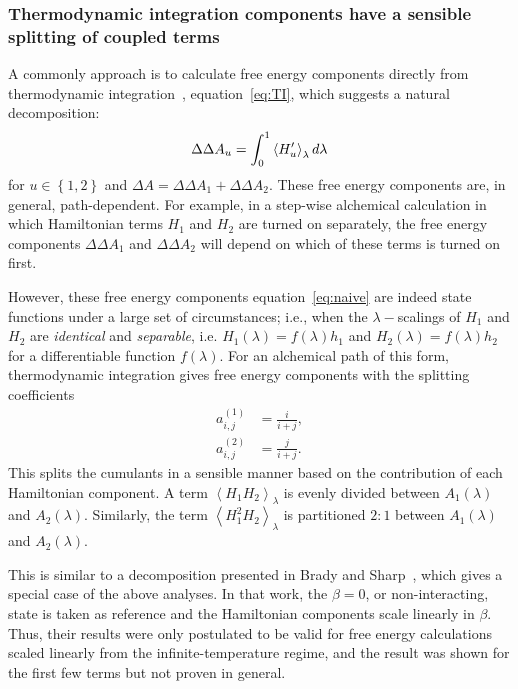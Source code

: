 \documentclass{article}
\begin{document}
\subsubsection{Thermodynamic integration components have a sensible splitting of coupled terms}

A commonly approach is to calculate free energy components directly from thermodynamic integration~\cite{NULL}, equation~\ref{eq:TI}, which suggests a natural decomposition:
\begin{equation}
\Delta \Delta  A_u =
	\int_0^1 \left\langle H_u' \right \rangle_\lambda d\lambda \nonumber\\
\label{eq:naive}
\end{equation}
for $u \in \left\{1,2 \right\}$ and $\Delta A = \Delta \Delta A_1 + \Delta \Delta A_2$.  These free energy components are, in general, path-dependent. For example, in a step-wise alchemical calculation in which Hamiltonian terms $H_1$ and $H_2$ are turned on separately, the free energy components $\Delta \Delta A_1$ and $\Delta \Delta A_2$ will depend on which of these terms is turned on first. 

However, these free energy components equation~\ref{eq:naive} are indeed state functions under a large set of circumstances; i.e., when the $\lambda-$scalings of $H_1$ and $H_2$ are \textit{identical} and \textit{separable}, i.e. $H_1 (\lambda) = f(\lambda) h_1$ and  $H_2 (\lambda) = f(\lambda) h_2$
for a differentiable function $f (\lambda)$. For an alchemical path of this form, thermodynamic integration gives free energy components with the splitting coefficients 
\begin{align} 
a_{i,j}^{(1)} &= \frac{i}{i+j}, \nonumber \\ 
a_{i,j}^{(2)} &= \frac{j}{i+j}.
\label{eq:BradyCoeffs}
\end{align} 
This splits the cumulants in a sensible manner based on the contribution of each Hamiltonian component. A term $\left \langle H_1 H_2 \right \rangle_\lambda$ is evenly divided between $A_1(\lambda)$ and $ A_2(\lambda)$. Similarly, the term $\left \langle H_1^2 H_2 \right \rangle_\lambda$ is partitioned $2:1$ between $A_1(\lambda)$ and $ A_2(\lambda)$. 

This is similar to a decomposition presented in Brady and Sharp~\cite{Brady:1996gm}, which gives a special case of the above analyses.  In that work, the $\beta=0$, or non-interacting, state is taken as reference and the Hamiltonian components scale linearly in $\beta$.  Thus, their results were only postulated to be valid for free energy calculations scaled linearly from the infinite-temperature regime, and the result was shown for the first few terms but not proven in general. 
\end{document}
